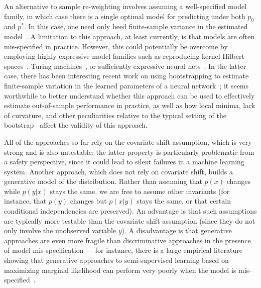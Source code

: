 \documentclass[a4paper,10pt]{article}
\begin{document}
An alternative to sample re-weighting involves assuming a well-specified model family, in which case there is a single optimal model for predicting under both $p_0$ and $p^*$. In this case, one need only heed finite-sample variance in the estimated model~\cite{blitzer2011domain,li2011knows}. A limitation to this approach, at least currently, is that models are often mis-specified in practice. However, this could potentially be overcome by employing highly expressive model families such as reproducing kernel Hilbert spaces~\cite{hofmann2008kernel}, Turing machines~\cite{solomonoff1964formalA,solomonoff1964formalB}, or sufficiently expressive neural nets~\cite{graves2014neural,kaiser2015neural}.  In the latter case, there has been interesting recent work on using bootstrapping to estimate finite-sample variation in the learned parameters of a neural network~\cite{osband2016deep}; it seems worthwhile to better understand whether this approach can be used to effectively estimate out-of-sample performance in practice, as well as how local minima, lack of curvature, and other peculiarities relative to the typical setting of the bootstrap~\cite{efron1979computers} affect the validity of this approach.

All of the approaches so far rely on the covariate shift assumption, which is very strong and is also untestable; the latter property is particularly problematic from a safety perspective, since it could lead to silent failures in a machine learning system. Another approach, which does not rely on covariate shift, builds a generative model of the distribution. Rather than assuming that $p(x)$ changes while $p(y|x)$ stays the same, we are free to assume other invariants (for instance, that $p(y)$ changes but $p(x|y)$ stays the same, or that certain conditional independencies are preserved). An advantage is that such assumptions are typically more testable than the covariate shift assumption (since they do not only involve the unobserved variable $y$). A disadvantage is that generative approaches are even more fragile than discriminative approaches in the presence of model mis-specification --- for instance, there is a large empirical literature showing that generative approaches to semi-supervised learning based on maximizing marginal likelihood can perform very poorly when the model is mis-specified~\cite{merialdo1994tagging,nigam1998learning,cozman2006risks,liang2008analyzing,li2015towards}.
\end{document}
